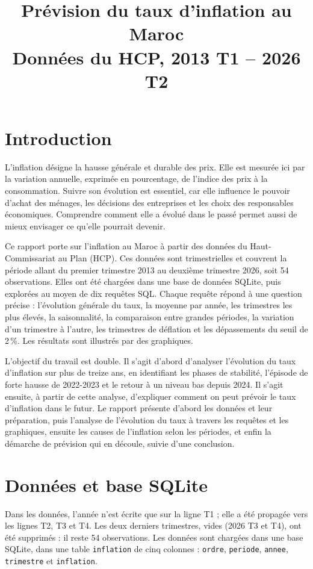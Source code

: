 \documentclass[11pt,a4paper]{article}
\title{\textbf{Prévision du taux d'inflation au Maroc}\\[0.3em]
\large Données du HCP, 2013 T1 -- 2026 T2}
\author{}
\date{}
\begin{document}
\maketitle

\section*{Introduction}
L'inflation désigne la hausse générale et durable des prix. Elle est mesurée ici par la variation annuelle, exprimée en pourcentage, de l'indice des prix à la consommation. Suivre son évolution est essentiel, car elle influence le pouvoir d'achat des ménages, les décisions des entreprises et les choix des responsables économiques. Comprendre comment elle a évolué dans le passé permet aussi de mieux envisager ce qu'elle pourrait devenir.

Ce rapport porte sur l'inflation au Maroc à partir des données du Haut-Commissariat au Plan (HCP). Ces données sont trimestrielles et couvrent la période allant du premier trimestre 2013 au deuxième trimestre 2026, soit 54 observations. Elles ont été chargées dans une base de données SQLite, puis explorées au moyen de dix requêtes SQL. Chaque requête répond à une question précise : l'évolution générale du taux, la moyenne par année, les trimestres les plus élevés, la saisonnalité, la comparaison entre grandes périodes, la variation d'un trimestre à l'autre, les trimestres de déflation et les dépassements du seuil de 2\,\%. Les résultats sont illustrés par des graphiques.

L'objectif du travail est double. Il s'agit d'abord d'analyser l'évolution du taux d'inflation sur plus de treize ans, en identifiant les phases de stabilité, l'épisode de forte hausse de 2022-2023 et le retour à un niveau bas depuis 2024. Il s'agit ensuite, à partir de cette analyse, d'expliquer comment on peut prévoir le taux d'inflation dans le futur. Le rapport présente d'abord les données et leur préparation, puis l'analyse de l'évolution du taux à travers les requêtes et les graphiques, ensuite les causes de l'inflation selon les périodes, et enfin la démarche de prévision qui en découle, suivie d'une conclusion.

\section{Données et base SQLite}
Dans les données, l'année n'est écrite que sur la ligne T1 ; elle a été propagée vers les lignes T2, T3 et T4. Les deux derniers trimestres, vides (2026 T3 et T4), ont été supprimés : il reste 54 observations. Les données sont chargées dans une base SQLite, dans une table \texttt{inflation} de cinq colonnes : \texttt{ordre}, \texttt{periode}, \texttt{annee}, \texttt{trimestre} et \texttt{inflation}.
\end{document}
